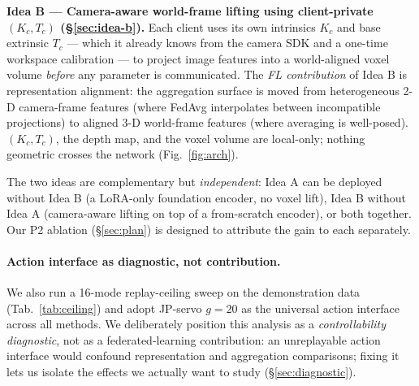 \documentclass{article}
\begin{document}
\noindent\textbf{Idea B --- Camera-aware world-frame lifting using
client-private $(K_c, T_c)$ (\S\ref{sec:idea-b}).} Each client uses
its own intrinsics $K_c$ and base extrinsic $T_c$ --- which it
already knows from the camera SDK and a one-time workspace
calibration --- to project image features into a world-aligned
voxel volume \emph{before} any parameter is communicated. The
\emph{FL contribution} of Idea B is representation alignment: the
aggregation surface is moved from heterogeneous 2-D camera-frame
features (where FedAvg interpolates between incompatible
projections) to aligned 3-D world-frame features (where averaging
is well-posed). $(K_c, T_c)$, the depth map, and the voxel volume
are local-only; nothing geometric crosses the network
(Fig.~\ref{fig:arch}).

\noindent The two ideas are complementary but \emph{independent}:
Idea A can be deployed without Idea B (a LoRA-only foundation
encoder, no voxel lift), Idea B without Idea A (camera-aware
lifting on top of a from-scratch encoder), or both together. Our
P2 ablation (\S\ref{sec:plan}) is designed to attribute the gain
to each separately.

\paragraph{Action interface as diagnostic, not contribution.}
We also run a 16-mode replay-ceiling sweep on the demonstration data
(Tab.~\ref{tab:ceiling}) and adopt JP-servo $g\!=\!20$ as the
universal action interface across all methods. We deliberately
position this analysis as a \emph{controllability diagnostic}, not
as a federated-learning contribution: an unreplayable action
interface would confound representation and aggregation
comparisons; fixing it lets us isolate the effects we actually want
to study (\S\ref{sec:diagnostic}).
\end{document}
